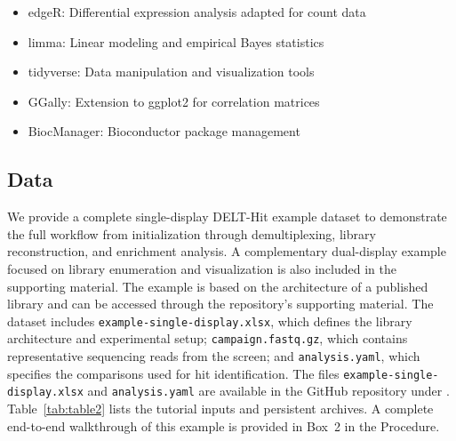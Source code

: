\begin{itemize}
  \item edgeR: Differential expression analysis adapted for count data
  \item limma: Linear modeling and empirical Bayes statistics
  \item tidyverse: Data manipulation and visualization tools
  \item GGally: Extension to ggplot2 for correlation matrices
  \item BiocManager: Bioconductor package management
\end{itemize}

\subsection{Data}
We provide a complete single-display DELT-Hit example dataset to demonstrate the full workflow from initialization through demultiplexing, library reconstruction, and enrichment analysis. A complementary dual-display example focused on library enumeration and visualization is also included in the supporting material. The example is based on the architecture of a published library\cite{bassi_singlestrandeddnaencodedchemical_2020} and can be accessed through the repository's supporting material.
The dataset includes \texttt{example-single-display.xlsx}, which defines the library architecture and experimental setup; \texttt{campaign.fastq.gz}, which contains representative sequencing reads from the screen; and \texttt{analysis.yaml}, which specifies the comparisons used for hit identification. The files \texttt{example-single-display.xlsx} and \texttt{analysis.yaml} are available in the GitHub repository under . Table~\ref{tab:table2} lists the tutorial inputs and persistent archives. A complete end-to-end walkthrough of this example is provided in Box~2 in the Procedure.



